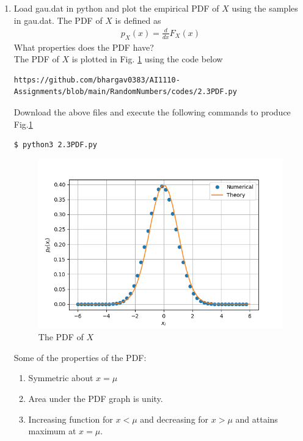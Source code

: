 \documentclass[journal,12pt,twocolumn]{IEEEtran}
\begin{document}
\begin{enumerate}[label=\thesection.\arabic*
,ref=\thesection.\theenumi]
\item
Load gau.dat in python and plot the empirical PDF of $X$ using the samples in gau.dat. The PDF of $X$ is defined as
\begin{align}
p_{X}(x) = \frac{d}{dx}F_{X}(x)
\end{align}
What properties does the PDF have?
\\
\solution The PDF of $X$ is plotted in Fig. \ref{fig:2.3} using the code below
\begin{lstlisting}
https://github.com/bhargav0383/AI1110-Assignments/blob/main/RandomNumbers/codes/2.3PDF.py
\end{lstlisting}
Download the above files and execute the following commands to produce Fig.\ref{fig:2.3}
\begin{lstlisting}
$ python3 2.3PDF.py
\end{lstlisting}
\begin{figure}[!h]
\centering
\includegraphics[width=\columnwidth]{./figs/2.3PDF.png}
\caption{The PDF of $X$}
\label{fig:2.3}
\end{figure}
Some of the properties of the PDF:
\begin{enumerate}
    \item Symmetric about $x=\mu$
    \item Area under the PDF graph is unity.
    \item Increasing function for $x<\mu$ and decreasing for $x>\mu$ and attains maximum at $x=\mu$.
\end{enumerate}


\end{enumerate}
\end{document}
